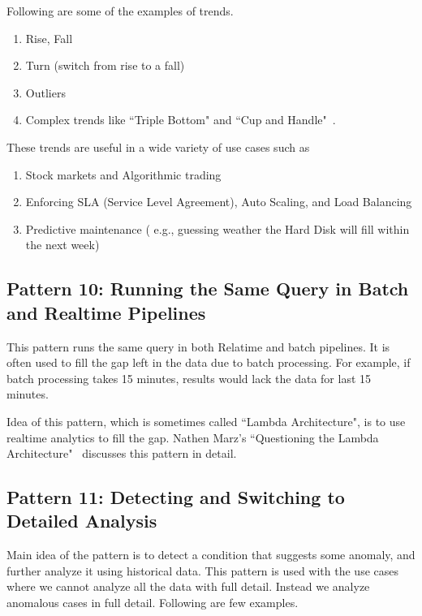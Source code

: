 \documentclass{sig-alternate}
\begin{document}
Following are some of the examples of trends. 

\begin{enumerate}
\item Rise, Fall
\item Turn (switch from rise to a fall)
\item Outliers
\item Complex trends like ``Triple Bottom" and ``Cup and Handle"~\cite{bulkowski2011encyclopedia}.
\end{enumerate}

These trends are useful in a wide variety of use cases such as 

\begin{enumerate}
\item Stock markets and Algorithmic trading 
\item Enforcing SLA (Service Level Agreement), Auto Scaling, and Load Balancing 
\item Predictive maintenance ( e.g., guessing weather the Hard Disk will fill within the next week)   
\end{enumerate}

\subsection{Pattern 10: Running the Same Query in Batch and Realtime Pipelines}

This pattern runs the same query in both Relatime and batch pipelines. It is often used to fill the gap left in the data due to batch processing. For example, if batch processing takes 15 minutes, results would lack the data for last 15 minutes. 

Idea of this pattern, which is sometimes called ``Lambda Architecture", is to use realtime analytics to fill the gap. Nathen Marz's ``Questioning the Lambda Architecture"~\cite{lambdaQ} discusses this pattern in detail.


\subsection{Pattern 11: Detecting and Switching to Detailed Analysis}
Main idea of the pattern is to detect a condition that suggests some anomaly, and further analyze it using historical data.  This pattern is used with the use cases where we cannot analyze all the data with full detail. Instead we analyze anomalous cases in full detail. Following are few examples. 
\end{document}
